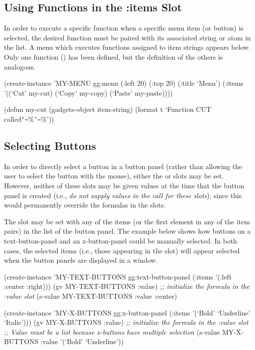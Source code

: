 \begin{group}
\section{Using Functions in the :items Slot}
\label{use-item-fn}
In order to execute a specific function when a specific menu item (or button)
is selected, the desired function must be paired with its associated string
or atom in the  list.  A menu which executes functions assigned to
item strings appears below.  Only one function
() has been defined, but the definition of the others is analogous.

\begin{programexample}
(create-instance 'MY-MENU gg:menu
   (:left 20)
   (:top 20)
   (:title `Menu')
   (:items '((`Cut' my-cut) (`Copy' my-copy) (`Paste' my-paste))))

(defun my-cut (gadgets-object item-string)
  (format t `Function CUT called{\tt\char`\~}\%{\tt\char`\~}\%'))
\end{programexample}
\end{group}

\begin{group}
\section{Selecting Buttons}
\label{sel-buttons}
In order to directly select a button in a button panel (rather than allowing
the user to select the button with the mouse), either the  or
 slots may be set.  However, neither of these slots may be
given values at the time that the button panel is created (i.e., {\it do not
supply values in the}  {\it call for these slots}),
since this would permanently override the formulas in the slots.

The  slot may be set with any of the items (or the first element in
any of the item pairs) in the  list
of the button panel.  The example below shows how buttons on a
text-button-panel and an x-button-panel could be manually selected.  In both
cases, the selected items (i.e., those appearing in the  slot) will
appear selected when the button panels are displayed in a window.

\begin{programexample}
(create-instance 'MY-TEXT-BUTTONS gg:text-button-panel
   (:items '(:left :center :right)))
(gv MY-TEXT-BUTTONS :value)   {\it ;; initialize the formula in the :value slot}
(s-value MY-TEXT-BUTTONS :value :center)

(create-instance 'MY-X-BUTTONS gg:x-button-panel
   (:items '(`Bold' `Underline' `Italic')))
(gv MY-X-BUTTONS :value)   {\it ;; initialize the formula in the :value slot}
{\it ;; Value must be a list because x-buttons have multiple selection}
(s-value MY-X-BUTTONS :value '(`Bold' `Underline'))
\end{programexample}
\end{group}

